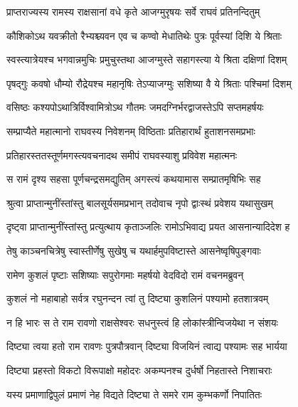 

\twolineshloka
{प्राप्तराज्यस्य रामस्य राक्षसानां वधे कृते}
{आजग्मुरृषयः सर्वे राघवं प्रतिनन्दितुम्} %

\twolineshloka
{कौशिकोऽथ यवक्रीतो रैभ्यश्च्यवन एव च}
{कण्वो मेधातिथेः पुत्रः पूर्वस्यां दिशि ये श्रिताः} %

\twolineshloka
{स्वस्त्यात्रेयश्च भगवान्नमुचिः प्रमुचुस्तथा}
{आजग्मुस्ते सहागस्त्या ये श्रिता दक्षिणां दिशम्} %

\twolineshloka
{पृषद्गुः कवषो धौम्यो रौद्रेयश्च महानृषिः}
{तेऽप्याजग्मुः सशिष्या वै ये श्रिताः पश्चिमां दिशम्} %

\twolineshloka
{वसिष्ठः कश्यपोऽथात्रिर्विश्वामित्रोऽथ गौतमः}
{जमदग्निर्भरद्वाजस्तेऽपि सप्तमहर्षयः} %

\twolineshloka
{सम्प्राप्यैते महात्मानो राघवस्य निवेशनम्}
{विष्ठिताः प्रतिहारार्थं हुताशनसमप्रभाः} %

\twolineshloka
{प्रतिहारस्ततस्तूर्णमगस्त्यवचनादथ}
{समीपं राघवस्याशु प्रविवेश महात्मनः} %

\twolineshloka
{स रामं दृश्य सहसा पूर्णचन्द्रसमद्युतिम्}
{अगस्त्यं कथयामास सम्प्रातमृषिभिः सह} %

\twolineshloka
{श्रुत्वा प्राप्तान्मुनींस्तांस्तु बालसूर्यसमप्रभान्}
{तदोवाच नृपो द्वाःस्थं प्रवेशय यथासुखम्} %

\twolineshloka
{दृष्ट्वा प्राप्तान्मुनींस्तांस्तु प्रत्युत्थाय कृताञ्जलिः}
{रामोऽभिवाद्य प्रयत आसनान्यादिदेश ह} %

\twolineshloka
{तेषु काञ्चनचित्रेषु स्वास्तीर्णेषु सुखेषु च}
{यथार्हमुपविष्टास्ते आसनेष्वृषिपुङ्गवाः} %

\twolineshloka
{रामेण कुशलं पृष्टाः सशिष्याः सपुरोगमाः}
{महर्षयो वेदविदो रामं वचनमब्रुवन्} %

\twolineshloka
{कुशलं नो महाबाहो सर्वत्र रघुनन्दन}
{त्वां तु दिष्ट्या कुशलिनं पश्यामो हतशात्रवम्} %

\twolineshloka
{न हि भारः स ते राम रावणो राक्षसेश्वरः}
{सधनुस्त्वं हि लोकांस्त्रीन्विजयेथा न संशयः} %

\twolineshloka
{दिष्ट्या त्वया हतो राम रावणः पुत्रपौत्रवान्}
{दिष्ट्या विजयिनं त्वाद्य पश्यामः सह भार्यया} %

\twolineshloka
{दिष्ट्या प्रहस्तो विकटो विरूपाक्षो महोदरः}
{अकम्पनश्च दुर्धर्षो निहतास्ते निशाचराः} %

\twolineshloka
{यस्य प्रमाणाद्विपुलं प्रमाणं नेह विद्यते}
{दिष्ट्या ते समरे राम कुम्भकर्णो निपातितः} %

